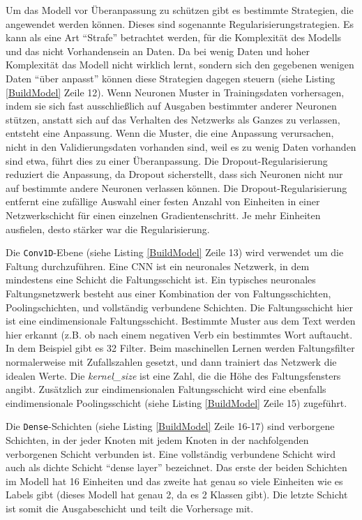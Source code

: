 Um das Modell vor Überanpassung zu schützen gibt es bestimmte Strategien, die angewendet werden können. Dieses sind sogenannte Regularisierungstrategien. Es kann als eine Art \enquote{Strafe} betrachtet werden, für die Komplexität des Modells und das nicht Vorhandensein an Daten. Da bei wenig Daten und hoher Komplexität das Modell nicht wirklich lernt, sondern sich den gegebenen wenigen Daten \enquote{über anpasst} können diese Strategien dagegen steuern (siehe Listing \ref{BuildModel} Zeile 12). Wenn Neuronen Muster in Trainingsdaten vorhersagen, indem sie sich fast ausschließlich auf Ausgaben bestimmter anderer Neuronen stützen, anstatt sich auf das Verhalten des Netzwerks als Ganzes zu verlassen, entsteht eine Anpassung. Wenn die Muster, die eine Anpassung verursachen, nicht in den Validierungsdaten vorhanden sind, weil es zu wenig Daten vorhanden sind etwa, führt dies zu einer Überanpassung. Die Dropout-Regularisierung reduziert die Anpassung, da Dropout sicherstellt, dass sich Neuronen nicht nur auf bestimmte andere Neuronen verlassen können. Die Dropout-Regularisierung entfernt eine zufällige Auswahl einer festen Anzahl von Einheiten in einer Netzwerkschicht für einen einzelnen Gradientenschritt. Je mehr Einheiten ausfielen, desto stärker war die Regularisierung.


Die \texttt{Conv1D}-Ebene (siehe Listing \ref{BuildModel} Zeile 13) wird verwendet um die Faltung durchzuführen. Eine CNN ist ein neuronales Netzwerk, in dem mindestens eine Schicht die Faltungsschicht ist. Ein typisches neuronales Faltungsnetzwerk besteht aus einer Kombination der von Faltungsschichten, Poolingschichten, und vollständig verbundene Schichten. Die Faltungsschicht hier ist eine eindimensionale Faltungsschicht. Bestimmte Muster aus dem Text werden hier erkannt (z.B. ob nach einem negativen Verb ein bestimmtes Wort auftaucht. In dem Beispiel gibt es 32 Filter. Beim maschinellen Lernen werden Faltungsfilter normalerweise mit Zufallszahlen gesetzt, und dann trainiert das Netzwerk die idealen Werte. Die \textit{kernel\_size} ist eine Zahl, die die Höhe des Faltungsfensters angibt. Zusätzlich zur eindimensionalen Faltungsschicht wird eine ebenfalls eindimensionale Poolingsschicht (siehe Listing \ref{BuildModel} Zeile 15) zugeführt.


Die \texttt{Dense}-Schichten (siehe Listing \ref{BuildModel} Zeile 16-17) sind verborgene Schichten, in der jeder Knoten mit jedem Knoten in der nachfolgenden verborgenen Schicht verbunden ist. Eine vollständig verbundene Schicht wird auch als dichte Schicht \enquote{dense layer} bezeichnet. Das erste der beiden Schichten im Modell hat 16 Einheiten und das zweite hat genau so viele Einheiten wie es Labels gibt (dieses Modell hat genau 2, da es 2 Klassen gibt). Die letzte Schicht ist somit die Ausgabeschicht und teilt die Vorhersage mit.



